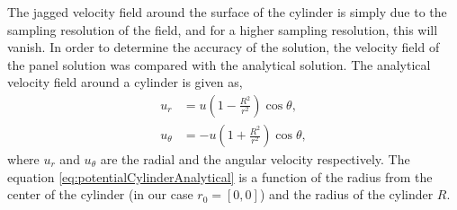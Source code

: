The jagged velocity field around the surface of the cylinder is simply due to the sampling resolution of the field, and for a higher sampling resolution, this will vanish. In order to determine the accuracy of the solution, the velocity field of the panel solution was compared with the analytical solution. The analytical velocity field around a cylinder is given as,
	\begin{subequations}
	\begin{align}
	u_r &= u\left(1 - \frac{R^2}{r^2}\right)\cos\theta,\\
	u_{\theta} &= -u\left(1+\frac{R^2}{r^2}\right)\cos\theta,
	\end{align}
	\label{eq:potentialCylinderAnalytical}
	\end{subequations}	
where $u_r$ and $u_{\theta}$ are the radial and the angular velocity respectively. The equation \ref{eq:potentialCylinderAnalytical} is a function of the radius from the center of the cylinder (in our case $r_0 = [0, 0]$) and the radius of the cylinder $R$. 

